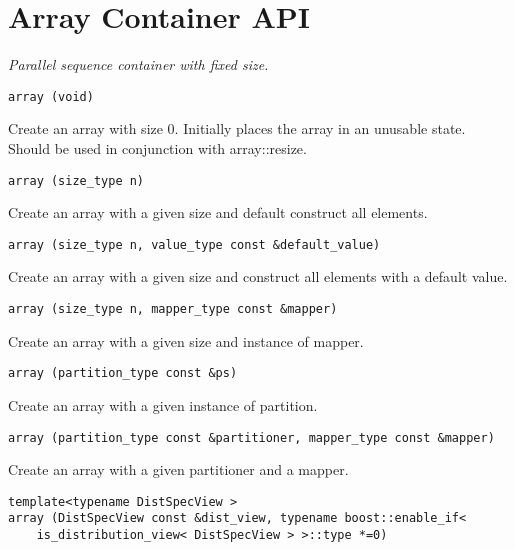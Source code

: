 
\pagebreak

\section{ Array Container API } \label{sec-ary-cont}

\emph{Parallel sequence container with fixed size. }

\begin{verbatim}
array (void)
\end{verbatim}

Create an array with size 0. Initially places the array in an unusable state. Should be used in conjunction with array::resize.
 
\begin{verbatim}
array (size_type n)
\end{verbatim}

Create an array with a given size and default construct all elements. 
 
\begin{verbatim}
array (size_type n, value_type const &default_value)
\end{verbatim}

Create an array with a given size and construct all elements with a default value. 
 
\begin{verbatim}
array (size_type n, mapper_type const &mapper)
\end{verbatim}

Create an array with a given size and instance of mapper. 
 
\begin{verbatim}
array (partition_type const &ps)
\end{verbatim}

Create an array with a given instance of partition. 
 
\begin{verbatim}
array (partition_type const &partitioner, mapper_type const &mapper)
\end{verbatim}

Create an array with a given partitioner and a mapper. 
 
\begin{verbatim}
template<typename DistSpecView >
array (DistSpecView const &dist_view, typename boost::enable_if< 
    is_distribution_view< DistSpecView > >::type *=0)
\end{verbatim}

